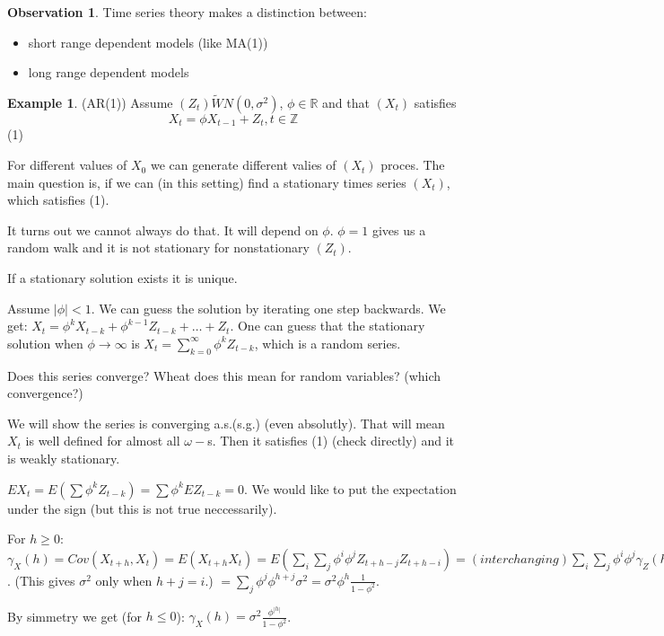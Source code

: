 \documentclass[12pt,a4paper]{amsart}
\theoremstyle{definition} %
\newtheorem{example}[defn]{Example}
\newtheorem{observation}[defn]{Observation}
\theoremstyle{plain} %
\newcommand{\R}{\mathbb R}
\newcommand{\Z}{\mathbb Z}
\begin{document}
\begin{observation}
Time series theory makes a distinction between:
\begin{itemize}
\item short range dependent models (like MA(1))
\item long range dependent models
\end{itemize}
\end{observation}


\begin{example} (AR(1))
Assume $(Z_t) \tilde WN(0, \sigma^2)$, $\phi \in \R$ and that $(X_t)$ satisfies 
$$X_t = \phi X_{t-1} +Z_t, t \in \Z$$ 
(1)

For different values of $X_0$ we can generate different valies of $(X_t)$ proces. The main question is, if we can (in this setting) find a stationary times series $(X_t)$, which satisfies
(1).

It turns out we cannot always do that. It will depend on $\phi$. $\phi = 1$ gives us a random walk and it is not stationary for nonstationary $(Z_t)$.

If a stationary solution exists it is unique.

Assume $|\phi| < 1$. We can guess the solution by iterating one step backwards. We get:
$X_t = \phi^kX_{t-k} + \phi^{k-1}Z_{t-k} + \dots + Z_t$.
One can guess that the stationary solution when $\phi \rightarrow \infty$ is $X_t = \sum_{k = 0}^\infty \phi^k Z_{t-k}$, which is a random series. 

Does this series converge? Wheat does this mean for random variables? (which convergence?) 

We will show the series is converging a.s.(s.g.) (even absolutly). That will mean $X_t$ is well defined for almost all $\omega-$s. Then it satisfies 
(1) (check directly) and it is weakly stationary. 

$EX_t = E(\sum \phi^k Z_{t-k}) = \sum \phi^k EZ_{t-k} = 0$. 
We would like to put the expectation under the sign (but this is not true neccessarily). 

For $h \geq 0$: 
$\gamma_X(h) = Cov(X_{t +h }, X_t) = E(X_{t+h}X_t) = E(\sum_i \sum_j \phi^i \phi^j Z_{t + h - j} Z_{t + h - i}) = (interchanging)
\sum_i \sum _j \phi^i \phi^j \gamma_Z(h-i+j)$.
(This gives $\sigma^2$ only when $h+j = i$.)
$= \sum_j \phi^j \phi^{h + j}\sigma^2 = \sigma^2 \phi^h \frac{1}{1 - \phi^2}$.

By simmetry we get (for $h \leq 0$):
$\gamma_X(h) = \sigma^2 \frac{\phi^{|h|}}{1 - \phi^2}$.


\end{example}
\end{document}
